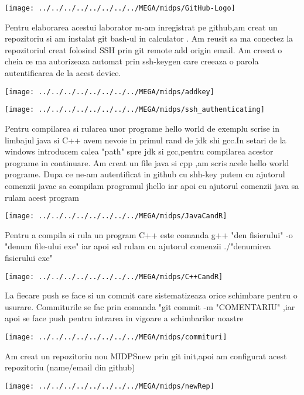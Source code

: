 \begin{center}
\texttt{[image: ../../../../../../../../MEGA/midps/GitHub-Logo]}
\end{center}
Pentru elaborarea acestui laborator m-am inregistrat pe github,am creat un repozitoriu si am instalat git bash-ul in calculator .
Am reusit sa ma conectez la repozitoriul creat folosind SSH prin git remote add origin email.
Am creeat o cheia ce ma autorizeaza automat prin  ssh-keygen care creeaza o parola autentificarea de la acest device.
\begin{center}
\texttt{[image: ../../../../../../../../MEGA/midps/addkey]}
\end{center}
\begin{center}
\texttt{[image: ../../../../../../../../MEGA/midps/ssh\_authenticating]}
\end{center}

Pentru compilarea si rularea unor programe hello world de exemplu scrise in limbajul java si C++ avem nevoie in primul rand de jdk shi gcc.In setari de la windows introducem calea "path" spre jdk si gcc,pentru compilarea acestor programe in continuare.
Am creat un file java si cpp ,am scris acele hello world programe.
Dupa ce ne-am autentificat in github cu shh-key putem cu ajutorul comenzii javac sa compilam programul jhello iar apoi cu ajutorul comenzii java sa rulam acest program 
\begin{center}
\texttt{[image: ../../../../../../../../MEGA/midps/JavaCandR]}
\end{center}
Pentru a compila si rula un program C++ este comanda g++ "den fisierului" -o "denum file-ului exe"
iar apoi sal rulam cu ajutorul comenzii
./"denumirea fisierului exe"
\begin{center}
\texttt{[image: ../../../../../../../../MEGA/midps/C++CandR]}
\end{center}

La fiecare push se face si un commit care sistematizeaza orice schimbare pentru o usurare.
Commiturile se fac prin comanda "git commit -m "COMENTARIU" ,iar apoi se face push pentru intrarea in vigoare a schimbarilor noastre
\begin{center}
\texttt{[image: ../../../../../../../../MEGA/midps/commituri]}
\end{center}

Am creat un repozitoriu nou MIDPSnew
prin git init,apoi am configurat acest repozitoriu (name/email din github)
\begin{center}
\texttt{[image: ../../../../../../../../MEGA/midps/newRep]}
\end{center}





